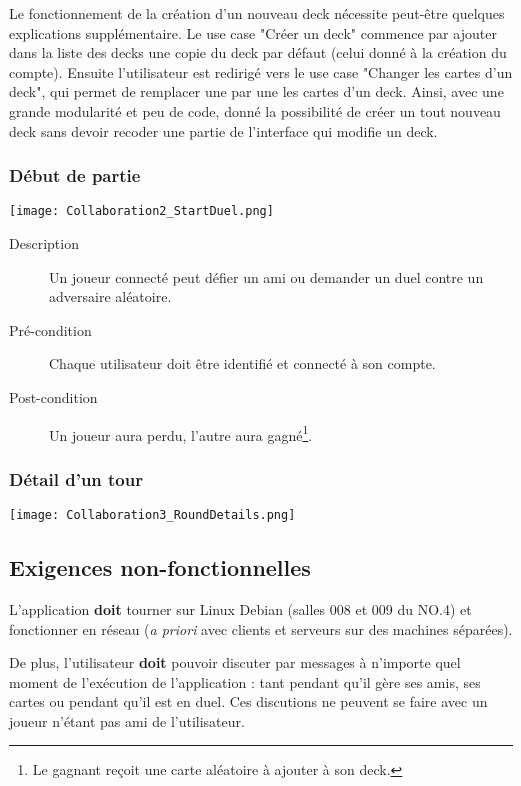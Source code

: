\documentclass{article}
\begin{document}
			Le fonctionnement de la création d'un nouveau deck nécessite peut-être quelques explications
			supplémentaire. Le use case "Créer un deck" commence par ajouter dans la liste des decks
			une copie du deck par défaut (celui donné à la création du compte). Ensuite l'utilisateur
			est redirigé vers le use case "Changer les cartes d'un deck", qui permet de remplacer
			une par une les cartes d'un deck. Ainsi, avec une grande modularité et peu de code,
			donné la possibilité de créer un tout nouveau deck sans devoir recoder une partie
			de l'interface qui modifie un deck.

		\subsubsection{Début de partie}
			\begin{center}\texttt{[image: Collaboration2\_StartDuel.png]}\end{center}

			\begin{description}
				\item[Description] Un joueur connecté peut défier un ami ou demander un duel contre un adversaire aléatoire.
				\item[Pré-condition] Chaque utilisateur doit être identifié et connecté à son compte.
				\item[Post-condition] Un joueur aura perdu, l'autre aura gagné\footnote{Le gagnant reçoit une carte aléatoire à ajouter à son \gls{deck}.}.
			\end{description}

		\subsubsection{Détail d'un tour}
			\begin{center}\texttt{[image: Collaboration3\_RoundDetails.png]}\end{center}

	\subsection{Exigences non-fonctionnelles}
		L'application \textbf{doit} tourner sur Linux Debian (salles 008 et 009 du NO.4) et fonctionner en réseau (\textit{a priori} avec clients
		et serveurs sur des machines séparées).

		De plus, l'utilisateur \textbf{doit} pouvoir discuter par messages à n'importe quel moment de l'exécution de l'application : tant pendant
		qu'il gère ses amis, ses cartes ou pendant qu'il est en \gls{duel}. Ces discutions ne peuvent se faire avec un joueur
		n'étant pas ami de l'utilisateur.
\end{document}

